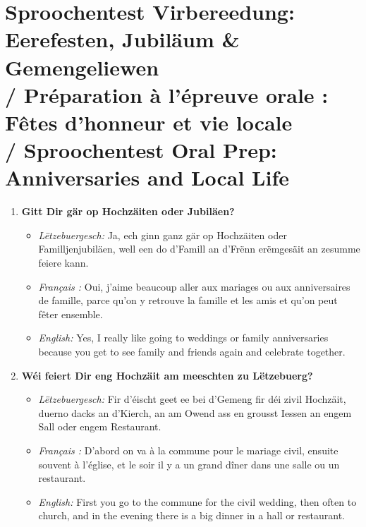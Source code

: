 \vspace{1.5em}

\section[Sproochentest Virbereedung / Sproochentest Oral Prep]{Sproochentest Virbereedung: Eerefesten, Jubiläum \& Gemengeliewen \\/ Préparation à l'épreuve orale : Fêtes d'honneur et vie locale \\/ Sproochentest Oral Prep: Anniversaries and Local Life}

\begin{enumerate}
    \item \textbf{Gitt Dir gär op Hochzäiten oder Jubiläen?}
    \begin{itemize}
        \item \textit{Lëtzebuergesch:} Ja, ech ginn ganz gär op Hochzäiten oder Familljenjubiläen, well een do d'Famill an d'Frënn erëmgesäit an zesumme feiere kann.
        \item \textit{Français :} Oui, j'aime beaucoup aller aux mariages ou aux anniversaires de famille, parce qu'on y retrouve la famille et les amis et qu'on peut fêter ensemble.
        \item \textit{English:} Yes, I really like going to weddings or family anniversaries because you get to see family and friends again and celebrate together.
    \end{itemize}

    \item \textbf{Wéi feiert Dir eng Hochzäit am meeschten zu Lëtzebuerg?}
    \begin{itemize}
        \item \textit{Lëtzebuergesch:} Fir d'éischt geet ee bei d'Gemeng fir déi zivil Hochzäit, duerno dacks an d'Kierch, an am Owend ass en grousst Iessen an engem Sall oder engem Restaurant.
        \item \textit{Français :} D'abord on va à la commune pour le mariage civil, ensuite souvent à l'église, et le soir il y a un grand dîner dans une salle ou un restaurant.
        \item \textit{English:} First you go to the commune for the civil wedding, then often to church, and in the evening there is a big dinner in a hall or restaurant.
    \end{itemize}


\end{enumerate}
